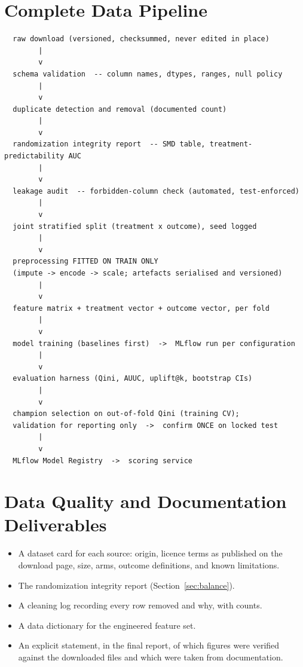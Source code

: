 \documentclass[11pt,a4paper]{article}
\begin{document}
\section{Complete Data Pipeline}

{\footnotesize
\begin{verbatim}
  raw download (versioned, checksummed, never edited in place)
        |
        v
  schema validation  -- column names, dtypes, ranges, null policy
        |
        v
  duplicate detection and removal (documented count)
        |
        v
  randomization integrity report  -- SMD table, treatment-predictability AUC
        |
        v
  leakage audit  -- forbidden-column check (automated, test-enforced)
        |
        v
  joint stratified split (treatment x outcome), seed logged
        |
        v
  preprocessing FITTED ON TRAIN ONLY
  (impute -> encode -> scale; artefacts serialised and versioned)
        |
        v
  feature matrix + treatment vector + outcome vector, per fold
        |
        v
  model training (baselines first)  ->  MLflow run per configuration
        |
        v
  evaluation harness (Qini, AUUC, uplift@k, bootstrap CIs)
        |
        v
  champion selection on out-of-fold Qini (training CV);
  validation for reporting only  ->  confirm ONCE on locked test
        |
        v
  MLflow Model Registry  ->  scoring service
\end{verbatim}}

\section{Data Quality and Documentation Deliverables}
\label{sec:data-quality}

\begin{itemize}
\item A dataset card for each source: origin, licence terms as published on the download page,
size, arms, outcome definitions, and known limitations.
\item The randomization integrity report (Section~\ref{sec:balance}).
\item A cleaning log recording every row removed and why, with counts.
\item A data dictionary for the engineered feature set.
\item An explicit statement, in the final report, of which figures were verified against the
downloaded files and which were taken from documentation.
\end{itemize}
\end{document}
